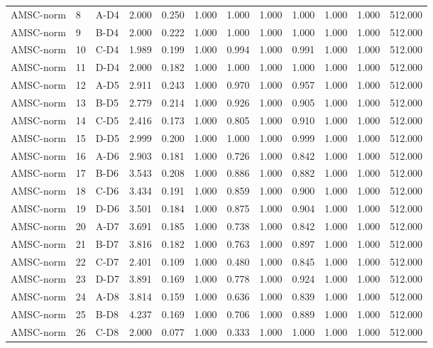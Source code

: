 \begin{table}[ht]
\begin{tabular}{lllrrrrrrrrr}
AMSC-norm & 8 & A-D4 & 2.000 & 0.250 & 1.000 & 1.000 & 1.000 & 1.000 & 1.000 & 1.000 & 512.000 \\
AMSC-norm & 9 & B-D4 & 2.000 & 0.222 & 1.000 & 1.000 & 1.000 & 1.000 & 1.000 & 1.000 & 512.000 \\
AMSC-norm & 10 & C-D4 & 1.989 & 0.199 & 1.000 & 0.994 & 1.000 & 0.991 & 1.000 & 1.000 & 512.000 \\
AMSC-norm & 11 & D-D4 & 2.000 & 0.182 & 1.000 & 1.000 & 1.000 & 1.000 & 1.000 & 1.000 & 512.000 \\
AMSC-norm & 12 & A-D5 & 2.911 & 0.243 & 1.000 & 0.970 & 1.000 & 0.957 & 1.000 & 1.000 & 512.000 \\
AMSC-norm & 13 & B-D5 & 2.779 & 0.214 & 1.000 & 0.926 & 1.000 & 0.905 & 1.000 & 1.000 & 512.000 \\
AMSC-norm & 14 & C-D5 & 2.416 & 0.173 & 1.000 & 0.805 & 1.000 & 0.910 & 1.000 & 1.000 & 512.000 \\
AMSC-norm & 15 & D-D5 & 2.999 & 0.200 & 1.000 & 1.000 & 1.000 & 0.999 & 1.000 & 1.000 & 512.000 \\
AMSC-norm & 16 & A-D6 & 2.903 & 0.181 & 1.000 & 0.726 & 1.000 & 0.842 & 1.000 & 1.000 & 512.000 \\
AMSC-norm & 17 & B-D6 & 3.543 & 0.208 & 1.000 & 0.886 & 1.000 & 0.882 & 1.000 & 1.000 & 512.000 \\
AMSC-norm & 18 & C-D6 & 3.434 & 0.191 & 1.000 & 0.859 & 1.000 & 0.900 & 1.000 & 1.000 & 512.000 \\
AMSC-norm & 19 & D-D6 & 3.501 & 0.184 & 1.000 & 0.875 & 1.000 & 0.904 & 1.000 & 1.000 & 512.000 \\
AMSC-norm & 20 & A-D7 & 3.691 & 0.185 & 1.000 & 0.738 & 1.000 & 0.842 & 1.000 & 1.000 & 512.000 \\
AMSC-norm & 21 & B-D7 & 3.816 & 0.182 & 1.000 & 0.763 & 1.000 & 0.897 & 1.000 & 1.000 & 512.000 \\
AMSC-norm & 22 & C-D7 & 2.401 & 0.109 & 1.000 & 0.480 & 1.000 & 0.845 & 1.000 & 1.000 & 512.000 \\
AMSC-norm & 23 & D-D7 & 3.891 & 0.169 & 1.000 & 0.778 & 1.000 & 0.924 & 1.000 & 1.000 & 512.000 \\
AMSC-norm & 24 & A-D8 & 3.814 & 0.159 & 1.000 & 0.636 & 1.000 & 0.839 & 1.000 & 1.000 & 512.000 \\
AMSC-norm & 25 & B-D8 & 4.237 & 0.169 & 1.000 & 0.706 & 1.000 & 0.889 & 1.000 & 1.000 & 512.000 \\
AMSC-norm & 26 & C-D8 & 2.000 & 0.077 & 1.000 & 0.333 & 1.000 & 1.000 & 1.000 & 1.000 & 512.000 \\

\end{tabular}
\end{table}
